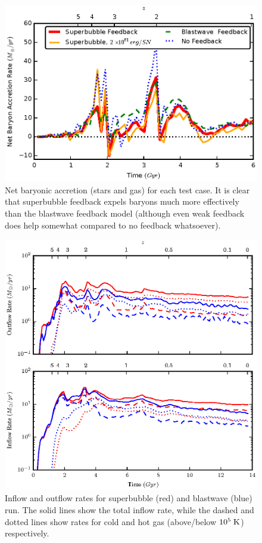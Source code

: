 \begin{figure}
    \includegraphics[width=\columnwidth]{figures2/net_accretion.eps}
    \caption[Net baryonic accretion for different feedback models]{Net baryonic
    accretion (stars and gas) for each test case.  It is clear that superbubble
    feedback expels baryons much more effectively than the blastwave feedback
    model (although even weak feedback does help somewhat compared to no
    feedback whatsoever).}
    \label{net_accretion}
\end{figure}
\begin{figure}
    \includegraphics[width=\columnwidth]{figures2/inflowoutflow.eps}
    \caption[Inflow and outflow rates for different feedback models]{Inflow and
    outflow rates for superbubble (red) and blastwave (blue) run.  The solid
    lines show the total inflow rate, while the dashed and dotted lines show
    rates for cold and hot gas (above/below $10^5\; \rm{K}$) respectively.  }
    \label{inflow_outflow}
\end{figure}
